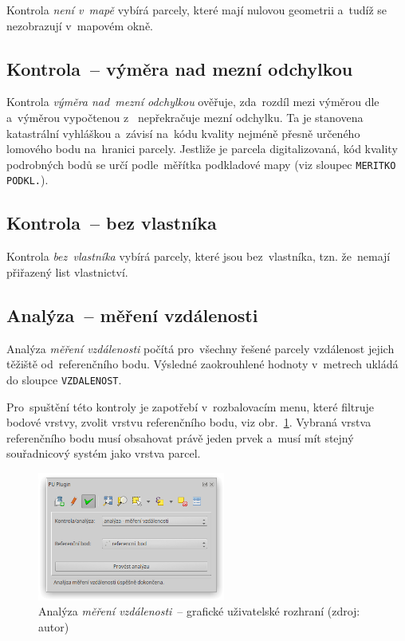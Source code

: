 Kontrola \textit{není v~mapě} vybírá parcely, které mají nulovou
geometrii a~tudíž se nezobrazují v~mapovém okně.

\subsection{Kontrola~– výměra nad mezní odchylkou}
\label{manual_kontrola_vymera}

Kontrola \textit{výměra nad~mezní odchylkou} ověřuje, zda~rozdíl mezi
výměrou dle~ a~výměrou vypočtenou z~ nepřekračuje
mezní odchylku. Ta je stanovena kata\-strální vyhláškou a~závisí na~kódu
kvality nejméně přesně určeného lomového bodu na~hranici
parcely. Jestliže je parcela digitalizovaná, kód kvality podrobných
bodů se určí podle~měřítka podkladové mapy (viz sloupec
\texttt{MERITKO PODKL.}).

\subsection{Kontrola~– bez vlastníka}
\label{manual_kontrola_bez_vlastnika}

Kontrola \textit{bez~vlastníka} vybírá parcely, které jsou
bez~vlastníka, tzn. že~nemají přiřazený list vlastnictví.

\subsection{Analýza~– měření vzdálenosti}
\label{manual_analyza_vzdalenosti}

Analýza \textit{měření vzdálenosti} počítá pro~všechny řešené parcely
vzdálenost jejich těžiště od~referenčního bodu. Výsledné zaokrouhlené
hodnoty v~metrech ukládá do sloupce \texttt{VZDALENOST}.

Pro~spuštění této kontroly je zapotřebí v~rozbalovacím menu, které
filtruje bodové vrstvy, zvolit vrstvu referenčního bodu, viz
obr.~\ref{fig:manual_analyza_vzdalenosti_gui}. Vybraná vrstva
referenčního bodu musí obsahovat právě jeden prvek a~musí mít stejný
souřadnicový systém jako vrstva parcel.

	\begin{figure}[H] \centering
		\includegraphics[width=0.55\textwidth]{./pictures/analyza_vzdalenost.png}
		\caption[Analýza \textit{měření vzdálenosti}~–
grafické uživatelské rozhraní]{Analýza \textit{měření vzdálenosti}~–
grafické uživatelské rozhraní (zdroj: autor)}
		\label{fig:manual_analyza_vzdalenosti_gui}
 	\end{figure}

